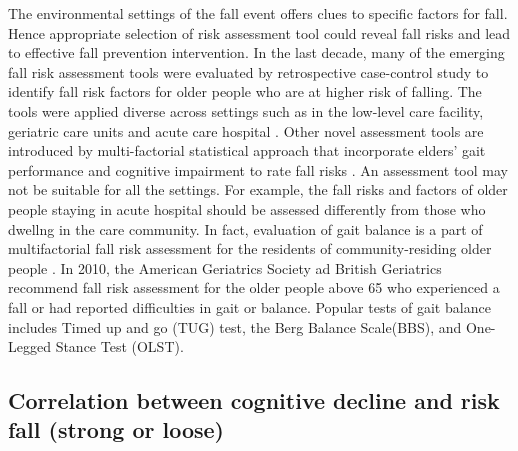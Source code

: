 \documentclass[conference,compsoc]{IEEEtran}
\begin{document}
The environmental settings of the fall event offers clues to specific factors for fall. Hence appropriate selection of risk assessment tool could reveal fall risks and lead to effective fall prevention intervention. In the last decade, many of the emerging fall risk assessment tools were evaluated by retrospective case-control study to identify fall risk factors for older people who are at higher risk of falling. The tools were applied diverse across settings such as in the low-level care facility\cite{van_Schooten_2020}, geriatric care units\cite{Michalcova_2020} and acute care hospital \cite{Chiu_2014, Aryee_2017}. Other novel assessment tools are introduced by multi-factorial statistical approach that incorporate elders' gait performance and cognitive impairment to rate fall risks \cite{Kikkert_2017,Taylor_2018}. An assessment tool may not be suitable for all the settings. For example, the fall risks and factors of older people staying in acute hospital should be assessed differently from those who dwellng in the care community. 
In fact, evaluation of gait balance is a part of multifactorial fall risk assessment for the residents of community-residing older people \cite{PreventionofFalls2011}. In 2010, the American Geriatrics Society ad British Geriatrics recommend fall risk assessment for the older people above 65 who experienced a fall or had reported difficulties in gait or balance. Popular tests of gait balance includes Timed up and go (TUG) test, the Berg Balance Scale(BBS), and One-Legged Stance Test (OLST). 

\subsection{Correlation between cognitive decline and risk fall (strong or loose)}
\begin{comment}
\textcolor{blue}{Executive function is the cognitive domain most commonly associated with gait dysfunction. Attention, sensory integration, and motor planning
are the sub-domains of executive function associated with risk of falls through gait dysfunction, whereas cognitive flexibility, judgement, and inhibitory control affect risk of falls through risk-taking behaviour\cite{Zhang_2019}}

\textcolor{blue}{Common tests of general sensori-motor function and balance in community-dwelling older adults include postural sway assessments, limit of stability tests, gait function (e.g. speed and variability), timed-up-and-go test (TUG), Berg Balance Scale, Tinetti Test and the physiological profile assessment (PPA). \cite{Carty_2014}}
\end{comment}
\end{document}
